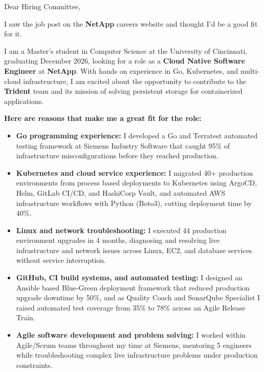 \documentclass[11pt]{letter}
\date{}
\begin{document}
\begin{letter}{}

\opening{Dear Hiring Committee,}

I saw the job post on the \textbf{NetApp} careers website and thought I'd be a good fit for it.

I am a Master's student in Computer Science at the University of Cincinnati, graduating December 2026, looking for a role as a \textbf{Cloud Native Software Engineer} at \textbf{NetApp}. With hands on experience in Go, Kubernetes, and multi-cloud infrastructure, I am excited about the opportunity to contribute to the \textbf{Trident} team and its mission of solving persistent storage for containerized applications.

\textbf{Here are reasons that make me a great fit for the role:}

\begin{itemize}[leftmargin=*, itemsep=0.45em]
    \item \textbf{Go programming experience:} I developed a Go and Terratest automated testing framework at Siemens Industry Software that caught 95\% of infrastructure misconfigurations before they reached production.

    \item \textbf{Kubernetes and cloud service experience:} I migrated 40+ production environments from process based deployments to Kubernetes using ArgoCD, Helm, GitLab CI/CD, and HashiCorp Vault, and automated AWS infrastructure workflows with Python (Boto3), cutting deployment time by 40\%.

    \item \textbf{Linux and network troubleshooting:} I executed 44 production environment upgrades in 4 months, diagnosing and resolving live infrastructure and network issues across Linux, EC2, and database services without service interruption.

    \item \textbf{GitHub, CI build systems, and automated testing:} I designed an Ansible based Blue-Green deployment framework that reduced production upgrade downtime by 50\%, and as Quality Coach and SonarQube Specialist I raised automated test coverage from 35\% to 78\% across an Agile Release Train.

    \item \textbf{Agile software development and problem solving:} I worked within Agile/Scrum teams throughout my time at Siemens, mentoring 5 engineers while troubleshooting complex live infrastructure problems under production constraints.
\end{itemize}


\end{letter}
\end{document}
